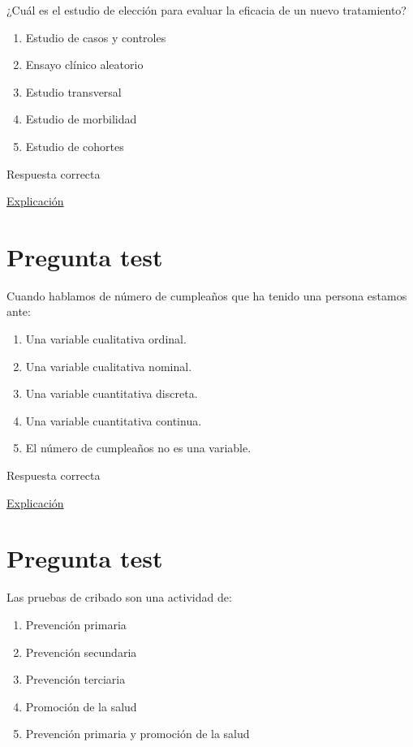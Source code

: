 \documentclass[
]{book}
\providecommand{\tightlist}{%
  \setlength{\itemsep}{0pt}\setlength{\parskip}{0pt}}
\begin{document}
¿Cuál es el estudio de elección para evaluar la eficacia de un nuevo tratamiento?

\begin{enumerate}
\def\labelenumi{\alph{enumi})}
\tightlist
\item
  Estudio de casos y controles
\item
  Ensayo clínico aleatorio
\item
  Estudio transversal
\item
  Estudio de morbilidad
\item
  Estudio de cohortes
\end{enumerate}

Respuesta correcta

\href{https://www.cancer.gov/espanol/publicaciones/diccionarios/diccionario-cancer/def/ensayo-clinico-aleatorizado}{Explicación}

\hypertarget{pregunta-test-31}{%
\section{Pregunta test}\label{pregunta-test-31}}

Cuando hablamos de número de cumpleaños que ha tenido una persona estamos ante:

\begin{enumerate}
\def\labelenumi{\alph{enumi})}
\tightlist
\item
  Una variable cualitativa ordinal.
\item
  Una variable cualitativa nominal.
\item
  Una variable cuantitativa discreta.
\item
  Una variable cuantitativa continua.
\item
  El número de cumpleaños no es una variable.
\end{enumerate}

Respuesta correcta

\href{https://1fjmanzano.github.io/bioestadistica/tipos-de-variables.html}{Explicación}

\hypertarget{pregunta-test-32}{%
\section{Pregunta test}\label{pregunta-test-32}}

Las pruebas de cribado son una actividad de:

\begin{enumerate}
\def\labelenumi{\alph{enumi})}
\tightlist
\item
  Prevención primaria
\item
  Prevención secundaria
\item
  Prevención terciaria
\item
  Promoción de la salud
\item
  Prevención primaria y promoción de la salud
\end{enumerate}
\end{document}
